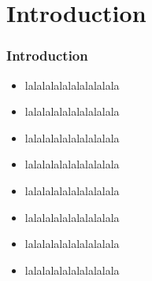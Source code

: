 \section{Introduction}
\frame
{
\frametitle{Introduction}
\begin{itemize}
	\item lalalalalalalalalalala
	\item lalalalalalalalalalala
	\item lalalalalalalalalalala
	\item lalalalalalalalalalala
	\item lalalalalalalalalalala
	\item lalalalalalalalalalala
	\item lalalalalalalalalalala
	\item lalalalalalalalalalala
\end{itemize}
}
